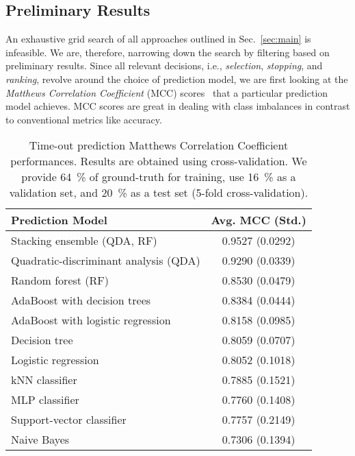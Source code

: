 \documentclass[runningheads]{llncs}
\begin{document}
\subsection{Preliminary Results}
\label{sec:evalprel}
An exhaustive grid search of all approaches outlined in Sec.~\ref{sec:main} is infeasible.
We are, therefore, narrowing down the search by filtering based on preliminary results.
Since all relevant decisions, i.e., \emph{selection}, \emph{stopping}, and \emph{ranking}, revolve around the choice of prediction model, we are first looking at the \emph{Matthews Correlation Coefficient} (MCC) scores~\cite{gorodkin2004comparing,matthews1975comparison} that a particular prediction model achieves.
MCC scores are great in dealing with class imbalances in contrast to conventional metrics like accuracy.

\begin{table}
  \centering
  \caption{
  	Time-out prediction Matthews Correlation Coefficient performances.
  	Results are obtained using cross-validation.
  	We provide \SI{64}{\%} of ground-truth for training, use \SI{16}{\%} as a validation set, and \SI{20}{\%} as a test set (5-fold cross-validation).
  }
  \label{tab:mcc}
  \begin{tabular}{lc}
    Prediction Model & Avg. MCC (Std.) \\
    \hline
    Stacking ensemble (QDA, RF)           & 0.9527 (0.0292) \\
    Quadratic-discriminant analysis (QDA) & 0.9290 (0.0339) \\
    Random forest (RF)                    & 0.8530 (0.0479) \\
    AdaBoost with decision trees          & 0.8384 (0.0444) \\
    AdaBoost with logistic regression     & 0.8158 (0.0985) \\
    Decision tree                         & 0.8059 (0.0707) \\
    Logistic regression                   & 0.8052 (0.1018) \\
    kNN classifier                        & 0.7885 (0.1521) \\
    MLP classifier                        & 0.7760 (0.1408) \\
    Support-vector classifier             & 0.7757 (0.2149) \\
    Naive Bayes                           & 0.7306 (0.1394) \\
    \hline
  \end{tabular}
\end{table}
\end{document}
